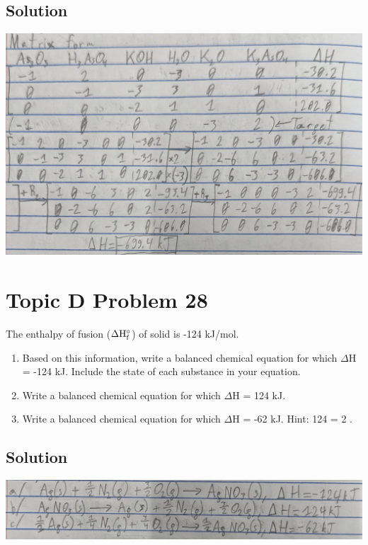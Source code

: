 \documentclass[10pt]{article}
\begin{document}
        \subsection{Solution}
            \begin{center}
                \includegraphics[width=\textwidth]{Answers Images/D27.jpg}
            \end{center}


    \pagebreak
    \section{Topic D Problem 28}
        The enthalpy of fusion ($\rm \Delta H_f^{\circ}$) of solid  is -124 kJ/mol.
        \begin{enumerate}[label=\alph*)]
            \item   Based on this information, write a balanced chemical equation for which $\Delta$H = -124 kJ. Include the state of each substance in your equation.
            \item   Write a balanced chemical equation for which $\Delta$H = 124 kJ.
            \item   Write a balanced chemical equation for which $\Delta$H = -62 kJ. Hint: 124 = 2 .
        \end{enumerate}

        \subsection{Solution}
            \begin{center}
                \includegraphics[width=\textwidth]{Answers Images/D28.jpg}
            \end{center}
\end{document}
